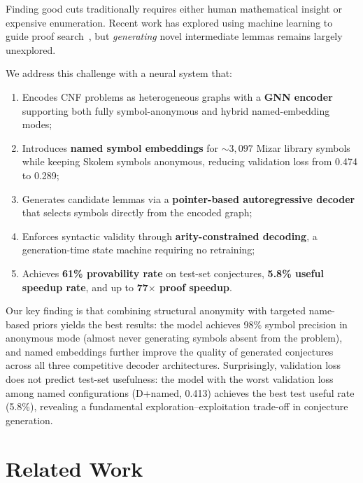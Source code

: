 \documentclass{article}
\begin{document}
Finding good cuts traditionally requires either human mathematical insight or
expensive enumeration. Recent work has explored using machine learning to guide
proof search~\cite{jakubuv2017enigma,loos2017deep,bansal2019holist}, but
\emph{generating} novel intermediate lemmas remains largely unexplored.

We address this challenge with a neural system that:
\begin{enumerate}
\item Encodes CNF problems as heterogeneous graphs with a \textbf{GNN encoder}
      supporting both fully symbol-anonymous and hybrid named-embedding modes;
\item Introduces \textbf{named symbol embeddings} for ${\sim}3{,}097$ Mizar
      library symbols while keeping Skolem symbols anonymous, reducing validation
      loss from 0.474 to 0.289;
\item Generates candidate lemmas via a \textbf{pointer-based autoregressive
      decoder} that selects symbols directly from the encoded graph;
\item Enforces syntactic validity through \textbf{arity-constrained decoding},
      a generation-time state machine requiring no retraining;
\item Achieves \textbf{61\% provability rate} on test-set conjectures,
      \textbf{5.8\% useful speedup rate}, and up to \textbf{77$\times$ proof speedup}.
\end{enumerate}

Our key finding is that combining structural anonymity with targeted name-based
priors yields the best results: the model achieves 98\% symbol precision in anonymous
mode (almost never generating symbols absent from the problem), and named embeddings
further improve the quality of generated conjectures across all three competitive
decoder architectures. Surprisingly, validation loss does not predict test-set
usefulness: the model with the worst validation loss among named configurations
(D+named, 0.413) achieves the best test useful rate (5.8\%), revealing a fundamental
exploration--exploitation trade-off in conjecture generation.

\section{Related Work}
\label{sec:related}
\end{document}
